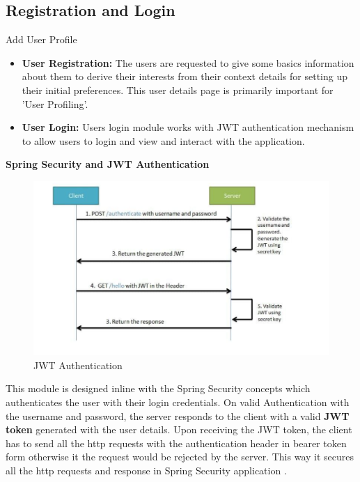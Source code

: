  
\subsection{Registration and Login}
   
   \begin{enumerate}
{\bf \item  Add User Profile}
    \begin{itemize}
       \item \textbf{User Registration:} The users are requested to give some basics information about them to derive their interests from their context details for setting up their initial preferences. This user details page is primarily important for 'User Profiling'.
       
       \item\textbf{ User Login: }
        Users login module works with JWT authentication mechanism to allow users to login and view and interact with the application. \newline
         \end{itemize}
       \textbf{ Spring Security and JWT Authentication}
        \begin{figure}[h!]
       \begin{center}
          \includegraphics[scale=0.8]{images/JWT.PNG}
            \centering \caption{JWT Authentication}
    \end{center}
    \end{figure}
        This module is designed inline with the Spring Security concepts which authenticates the user with their login credentials.
        On valid Authentication with the username and password, the server responds to the client with a valid\textbf{ JWT token} generated with the user details.
        Upon receiving the JWT token, the client has to send all the http requests with the authentication header in bearer token form otherwise it the request would be rejected by the server.\newline 
        This way it secures all the http requests and response in Spring Security application \cite{jwt2020}.
    

\end{enumerate}
